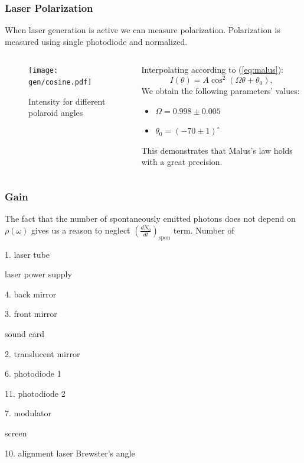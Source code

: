 \documentclass{beamer}
\begin{document}
	
	\begin{frame}
		\frametitle{Laser Polarization}
		When laser generation is active we can measure polarization. Polarization is measured using single photodiode and normalized.
		\vspace{-20pt}
		\begin{columns}
			\begin{column}{0.6\textwidth}
				\begin{figure}
					\centering
					\texttt{[image: gen/cosine.pdf]}
					\caption{Intensity for different polaroid angles}
				\end{figure}
			\end{column}
			\begin{column}{0.4\textwidth}
				Interpolating according to (\ref{eq:malus}):
				$$I(\theta) = A \cos^2{(\Omega \theta + \theta_0)},$$
				We obtain the following parameters' values: 
				
				\begin{itemize}
					\item[] $\Omega = 0.998 \pm 0.005$
					\item[] $\theta_0 = (-70 \pm 1)^\circ$
				\end{itemize}
			
			This demonstrates that Malus's law holds with a great precision.
			\end{column}
		\end{columns}
		
		
	\end{frame}
	
	
	
	\begin{frame}
		\frametitle{Gain}
		The fact that the number of spontaneously emitted photons does not depend on  $\rho(\omega)$ gives us a reason to neglect $\left(\frac{dN_0}{dt}\right)_{\text{spon}}$ term. Number of 
		
		1. laser tube
		
		laser power supply
		
		4. back mirror
		
		3. front mirror
		
		sound card
		
		2. translucent mirror
		
		6. photodiode 1
		
		11. photodiode 2
		
		7. modulator
		
		screen
		
		10. alignment laser
		Brewster's angle
	
	
	
	\end{frame}
	
\end{document}
